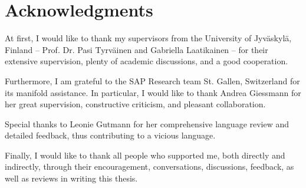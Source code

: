\chapter*{Acknowledgments}\label{ch:Acknowledgments}
\thispagestyle{empty}

At first, I would like to thank my supervisors from the University of Jyv\"askyl\"a, Finland -- Prof. Dr. Pasi Tyrv\"ainen and Gabriella Laatikainen -- for their extensive supervision, plenty of academic discussions, and a good cooperation.

\vspace{0.5cm}
\noindent
Furthermore, I am grateful to the SAP Research team St. Gallen, Switzerland for its manifold assistance. In particular, I would like to thank Andrea \mbox{Giessmann} for her great supervision, constructive criticism, and pleasant collaboration.

\vspace{0.5cm}
\noindent
Special thanks to Leonie Gutmann for her comprehensive language review and detailed feedback, thus contributing to a vicious language.

\vspace{0.5cm}
\noindent
Finally, I would like to thank all people who supported me, both directly and indirectly, through their encouragement, conversations, discussions, feedback, as well as reviews in writing this thesis.